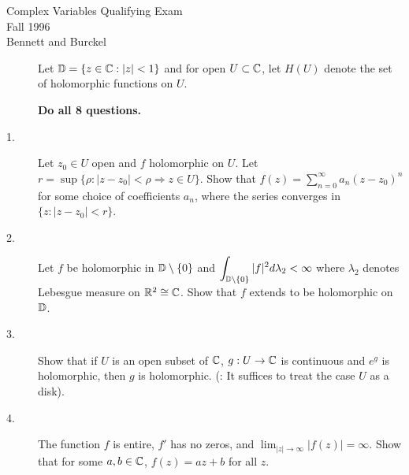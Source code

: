 \documentclass[bbb]{report}
\def\ds{\displaystyle}
\begin{document}

\begin{Large}

\begin{center}
   Complex Variables Qualifying Exam \\
   Fall 1996 \\
   Bennett and Burckel
\end{center}

\vspace{.1in}

\begin{description}

\item[] Let ${\Bbb D}=\{z\in{\Bbb C}: |z|<1\}$ 
and for open $U\subset {\Bbb C}$, let $H(U)$ 
denote the set of holomorphic functions on $U$.

\item[] {\bf Do all 8 questions.}

\vspace{.1in}

\item[1.] Let $z_0\in U$ open and $f$ holomorphic on $U$.
Let $r=\sup\{\rho: |z-z_0|<\rho\Rightarrow z\in U\}$. 
Show that $f(z)=\ds\sum^{\infty}_{n=0} a_n(z-z_0)^n$ 
for some choice of coefficients $a_n$, 
where the series converges in 
$\{z: |z-z_0|<r\}$.

\vspace{.35in}

\item[2.] Let $f$ be holomorphic in 
${\Bbb D}\setminus\{0\}$ and 
$\ds\int_{{\Bbb D}\setminus\{0\}} |f|^2d\lambda_2<\infty$ 
where $\lambda_2$ denotes Lebesgue measure on 
${\Bbb R}^2\cong{\Bbb C}$. Show that $f$ extends to be
holomorphic on ${\Bbb D}$.

\vspace{.35in}

\item[3.] Show that if $U$ is an open subset of ${\Bbb C}$, 
$g:U\to {\Bbb C}$ is continuous and $e^g$ is holomorphic,
then $g$ is holomorphic. (: It suffices to
treat the case $U$ as a disk).

\vspace{.35in}

\item[4.] The function $f$ is entire, $f'$ has no zeros, and
$\ds\lim_{|z|\to\infty} |f(z)|=\infty$. Show that for some 
$a,b\in{\Bbb C}$, $f(z)=az+b$ for all $z$.

\vspace{.35in}


\end{description}
\end{Large}
\end{document}
